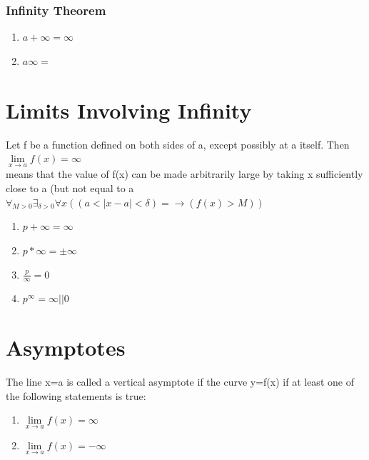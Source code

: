 \documentclass{article}
\begin{document}
 
 
 
\subsubsection{Infinity Theorem}
\begin{enumerate}
	\item $a + \infty = \infty$
	\item $a\infty =$
\end{enumerate}
 
 
 \section{Limits Involving Infinity}
 Let f be a function defined on both sides of a, except possibly at a itself. Then $\lim\limits_{x\to a} f(x) = \infty$ \\
 means that the value of f(x) can be made arbitrarily large by taking x sufficiently close to a (but not equal to a \\
 $\forall_{M>0} \exists_{ \delta>0} \forall x ((a < |x-a| < \delta) = \rightarrow (f(x) > M))$ 
 
\begin{enumerate}
	\item $p+\infty = \infty$
	\item $p*\infty = \pm\infty$
	\item $\frac{p}{\infty} = 0$
	\item $p^\infty = \infty || 0$
\end{enumerate}


\section{Asymptotes}
The line x=a is called a vertical asymptote if the curve y=f(x) if at least one of the following statements is true:
\begin{enumerate}
	\item $\lim\limits_{x\to a} f(x) = \infty$
	\item $\lim\limits_{x\to a} f(x) = -\infty$
\end{enumerate} 
\end{document}
